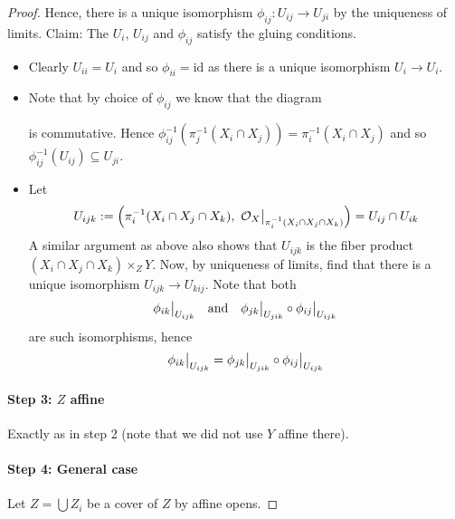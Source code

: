 \documentclass{scrartcl}
\renewcommand{\O}{\mathcal{O}}
\newcommand\restr[2]{{
    \left.\kern-\nulldelimiterspace
    #1
    \vphantom{\big|}
    \right|_{#2}
}}
\theoremstyle{definition}
\begin{document}
\begin{proof}
    Hence, there is a unique isomorphism $\phi_{ij}: U_{ij} \to U_{ji}$ by the uniqueness of limits.
    Claim: The $U_i$, $U_{ij}$ and $\phi_{ij}$ satisfy the gluing conditions.
    \begin{itemize}
        \item Clearly $U_{ii} = U_i$ and so $\phi_{ii} = \mathrm{id}$ as there is a unique isomorphism $U_i \to U_i$.
        \item Note that by choice of $\phi_{ij}$ we know that the diagram
        \begin{center}
        \end{center}
        is commutative.
        Hence $\phi_{ij}^{-1}(\pi_j^{-1}(X_i \cap X_j)) = \pi_i^{-1}(X_i \cap X_j)$ and so $\phi_{ij}^{-1}(U_{ij}) \subseteq U_{ji}$.
        \item Let
        \begin{equation*}
            U_{ijk} := \Bigl( \pi_i^{-1}(X_i \cap X_j \cap X_k), \ \restr{\O_{X}}{\pi_i^{-1}(X_i \cap X_j \cap X_k)} \Bigr) = U_{ij} \cap U_{ik}
        \end{equation*}
        A similar argument as above also shows that $U_{ijk}$ is the fiber product $(X_i \cap X_j \cap X_k) \times_Z Y$.
        Now, by uniqueness of limits, find that there is a unique isomorphism $U_{ijk} \to U_{kij}$.
        Note that both
        \begin{equation*}
            \restr{\phi_{ik}}{U_{ijk}} \quad \text{and} \quad \restr{\phi_{jk}}{U_{jik}} \circ \restr{\phi_{ij}}{U_{ijk}}
        \end{equation*}
        are such isomorphisms, hence 
        \begin{equation*}
            \restr{\phi_{ik}}{U_{ijk}} = \restr{\phi_{jk}}{U_{jik}} \circ \restr{\phi_{ij}}{U_{ijk}}
        \end{equation*}
    \end{itemize}

    \paragraph{Step 3: $Z$ affine} Exactly as in step 2 (note that we did not use $Y$ affine there).

    \paragraph{Step 4: General case} Let $Z = \bigcup Z_i$ be a cover of $Z$ by affine opens.
\end{proof}
\end{document}
